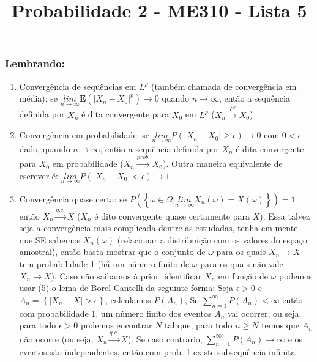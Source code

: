 \documentclass[english]{article}
\begin{document}
\title{Probabilidade 2 - ME310 - Lista 5}

\maketitle

\subsubsection*{Lembrando:}
\begin{enumerate}
\item Convergência de sequências em $L^{p}$ (também chamada de convergência
em média): se $\underset{n\rightarrow\infty}{lim}\mathbf{E}(\left|X_{n}-X_{0}\right|^{p})\rightarrow0$
quando $n\rightarrow\infty$, então a sequência definida por $X_{n}$
é dita convergente para $X_{0}$ em $L^{p}$ ($X_{n}\overset{L^{p}}{\rightarrow}X_{0}$)
\item Convergência em probabilidade: se $\underset{n\rightarrow\infty}{lim}P(\left|X_{n}-X_{0}\right|\ge\epsilon)\rightarrow0$
com $0<\epsilon$ dado, quando $n\rightarrow\infty$, então a sequência
definida por $X_{n}$ é dita convergente para $X_{0}$ em probabilidade
($X_{n}\overset{prob.}{\rightarrow}X_{0}$). Outra maneira equivalente
de escrever é: $\underset{n\rightarrow\infty}{lim}P(\left|X_{n}-X_{0}\right|<\epsilon)\rightarrow1$
\item Convergência quase certa: se $P(\left\{ \omega\in\Omega|\underset{n\rightarrow\infty}{lim}X_{n}\left(\omega\right)=X\left(\omega\right)\right\} )=1$
então $X_{n}\overset{q.c.}{\rightarrow}X$ ($X_{n}$ é dito convergente
quase certamente para $X$). Essa talvez seja a convergência mais
complicada dentre as estudadas, tenha em mente que SE sabemos $X_{n}(\omega)$
(relacionar a distribuição com os valores do espaço amostral), então
basta mostrar que o conjunto de $\omega$ para os quais $X_{n}\to X$
tem probabilidade 1 (há um número finito de $\omega$ para os quais
não vale $X_{n}\to X$). Caso não saibamos à priori identificar $X_{n}$
em função de $\omega$ podemos usar (5) o lema de Borel-Cantelli da
seguinte forma: Seja $\epsilon>0$ e $A_{n}=\left\{ |X_{n}-X|>\epsilon\right\} $,
calculamos $P(A_{n})$, Se $\sum_{n=1}^{\infty}P(A_{n})<\infty$ então
com probabilidade 1, um número finito dos eventos $A_{n}$ vai ocorrer,
ou seja, para todo $\epsilon>0$ podemos encontrar $N$ tal que, para
todo $n\ge N$ temos que $A_{n}$ não ocorre (ou seja, $X_{n}\overset{q.c.}{\to}X$).
Se caso contrario, $\sum_{n=1}^{\infty}P(A_{n})\to\infty$ e os eventos
são independentes, então com prob. 1 existe subsequência infinita

\end{enumerate}
\end{document}
